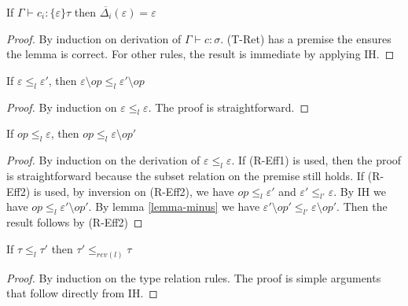 \begin{lemma} 
\label{lemma-exact}
If $\Gamma \vdash c_i : \{\varepsilon\}\tau$ then $\overline{\Delta_i}(\varepsilon) = \varepsilon$
\begin{proof}
By induction on derivation of $\Gamma \vdash c : \sigma$. (T-Ret) has a premise the ensures the lemma is correct. For other rules, the result is immediate by applying IH.

\end{proof}
\end{lemma}

\begin{lemma}
\label{lemma-minus}
If $\varepsilon \leq_l \varepsilon'$, then $\varepsilon \setminus op \leq_l \varepsilon' \setminus op$
\begin{proof}
By induction on $\varepsilon \leq_l \varepsilon$. The proof is straightforward.
\end{proof}

\end{lemma}

\begin{lemma}
\label{lemma-relation}
If $op \leq_{l} \varepsilon$, then $op \leq_{l} \varepsilon \setminus op'$
\begin{proof}
By induction on the derivation of $\varepsilon \leq_l \varepsilon$. If (R-Eff1) is used, then the proof is straightforward because the subset relation on the premise still holds. If (R-Eff2) is used, by inversion on (R-Eff2), we have $op \leq_l \varepsilon'$ and $\varepsilon' \leq_{l'} \varepsilon$. By IH we have $op \leq_l \varepsilon' \setminus op'$. By lemma \ref{lemma-minus} we have $\varepsilon'  \setminus op' \leq_{l'} \varepsilon \setminus op'$. Then the result follows by (R-Eff2)
\end{proof}
\end{lemma}

\begin{lemma}
\label{lemma-relation2}
If $\tau \leq_l \tau'$ then $\tau' \leq_{rev(l)} \tau$
\begin{proof}
By induction on the type relation rules. The proof is simple arguments that follow directly from IH.  
\end{proof}
\end{lemma}

